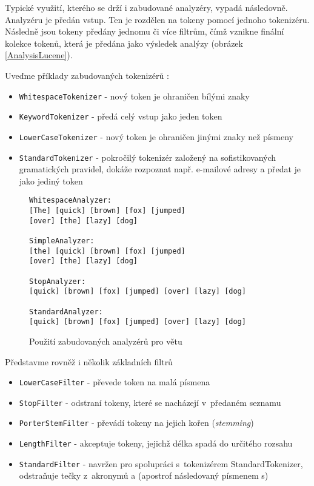 \documentclass[11pt,oneside]{fithesis2}
\begin{document}
Typické využití, kterého se drží i zabudované analyzéry, vypadá následovně. Analyzéru je předán vstup. Ten je rozdělen na tokeny pomocí jednoho tokenizéru. Následně jsou tokeny předány jednomu či více filtrům, čímž vznikne finální kolekce tokenů, která je předána jako výsledek analýzy (obrázek \ref{AnalysisLucene}).

Uveďme příklady zabudovaných tokenizérů  \cite[s.~118]{LuceneAction}:

\begin{itemize}
	\item \texttt{WhitespaceTokenizer} - nový token je ohraničen bílými znaky
	\item \texttt{KeywordTokenizer} - předá celý vstup jako jeden token
	\item \texttt{LowerCaseTokenizer} - nový token je ohraničen jinými znaky než písmeny
	\item \texttt{StandardTokenizer} - pokročilý tokenizér založený na sofistikovaných gramatických pravidel, dokáže rozpoznat např. e-mailové adresy a předat je jako jediný token
\end{itemize}

\begin{figure}[!htbp]
\begin{lstlisting}[frame=single]
WhitespaceAnalyzer:
[The] [quick] [brown] [fox] [jumped]
[over] [the] [lazy] [dog]

SimpleAnalyzer:
[the] [quick] [brown] [fox] [jumped] 
[over] [the] [lazy] [dog]

StopAnalyzer:
[quick] [brown] [fox] [jumped] [over] [lazy] [dog]

StandardAnalyzer:
[quick] [brown] [fox] [jumped] [over] [lazy] [dog]
\end{lstlisting}
\caption{Použití zabudovaných analyzérů pro větu \emph{}}
\label{AnalysisExample1}
\end{figure}

Představme rovněž i několik základních filtrů  \cite[s.~118]{LuceneAction}
\begin{itemize}
	\item \texttt{LowerCaseFilter} - převede token na malá písmena
	\item \texttt{StopFilter} - odstraní tokeny, které se nacházejí v~předaném seznamu
	\item \texttt{PorterStemFilter} - převádí tokeny na jejich kořen (\emph{stemming})
	\item \texttt{LengthFilter} - akceptuje tokeny, jejichž délka spadá do určitého rozsahu
	\item \texttt{StandardFilter} - navržen pro spolupráci s~tokenizérem StandardTokenizer, odstraňuje tečky z~akronymů a  (apostrof následovaný písmenem s)
\end{itemize}
\end{document}
